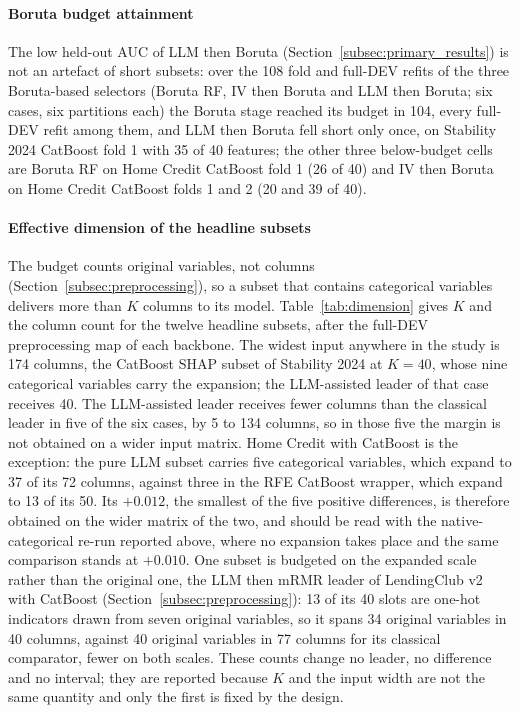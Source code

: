 \documentclass[final,5p,twocolumn]{elsarticle}
\newcommand{\Kfeat}{K}
\begin{document}
\paragraph{Boruta budget attainment}
The low held-out AUC of LLM then Boruta (Section~\ref{subsec:primary_results}) is not an artefact of short subsets: over the 108 fold and full-DEV refits of the three Boruta-based selectors (Boruta RF, IV then Boruta and LLM then Boruta; six cases, six partitions each) the Boruta stage reached its budget in 104, every full-DEV refit among them, and LLM then Boruta fell short only once, on Stability 2024 CatBoost fold 1 with 35 of 40 features; the other three below-budget cells are Boruta RF on Home Credit CatBoost fold 1 (26 of 40) and IV then Boruta on Home Credit CatBoost folds 1 and 2 (20 and 39 of 40).

\paragraph{Effective dimension of the headline subsets}
The budget counts original variables, not columns (Section~\ref{subsec:preprocessing}), so a subset that contains categorical variables delivers more than $\Kfeat$ columns to its model. Table~\ref{tab:dimension} gives $\Kfeat$ and the column count for the twelve headline subsets, after the full-DEV preprocessing map of each backbone. The widest input anywhere in the study is 174 columns, the CatBoost SHAP subset of Stability 2024 at $\Kfeat=40$, whose nine categorical variables carry the expansion; the LLM-assisted leader of that case receives 40. The LLM-assisted leader receives fewer columns than the classical leader in five of the six cases, by 5 to 134 columns, so in those five the margin is not obtained on a wider input matrix. Home Credit with CatBoost is the exception: the pure LLM subset carries five categorical variables, which expand to 37 of its 72 columns, against three in the RFE CatBoost wrapper, which expand to 13 of its 50. Its $+0.012$, the smallest of the five positive differences, is therefore obtained on the wider matrix of the two, and should be read with the native-categorical re-run reported above, where no expansion takes place and the same comparison stands at $+0.010$. One subset is budgeted on the expanded scale rather than the original one, the LLM then mRMR leader of LendingClub v2 with CatBoost (Section~\ref{subsec:preprocessing}): 13 of its 40 slots are one-hot indicators drawn from seven original variables, so it spans 34 original variables in 40 columns, against 40 original variables in 77 columns for its classical comparator, fewer on both scales. These counts change no leader, no difference and no interval; they are reported because $\Kfeat$ and the input width are not the same quantity and only the first is fixed by the design.
\end{document}

